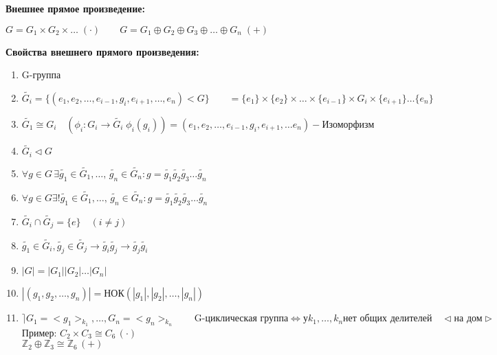 \documentclass[12pt]{article}
\begin{document}
				
		
		
		
		\hypertarget{def:out_comp}{\textbf{Внешнее прямое произведение:}} $G=G_1 \times G_2 \times \dots \; (\cdot) \qquad G=G_1\oplus G_2 \oplus G_3 \oplus \dots \oplus G_n \; (+)$
		
		
		\hypertarget{inpro:out_comp}{\textbf{Свойства внешнего прямого произведения:}}
		\begin{enumerate}
			\item G-группа
			\item $\tilde{G_i}=\{ (e_1, e_2, \dots , e_{i-1}, g_i, e_{i+1}, \dots, e_n)<G \} \qquad 
			=\{e_1 \}\times \{e_2\} \times \dots \times \{e_{i-1}\} \times G_i \times \{e_{i+1}\}\dots \{e_n\}$
			\item $\tilde{G_1} \cong G_i \quad (\phi_i :G_i \rightarrow \tilde{G_i} \; \phi_i(g_i))=(e_1, e_2, \dots, e_{i-1}, g_i, e_{i+1}, \dots e_n)- \text{Изоморфизм} $
			\item $\tilde{G_i} \lhd G$
			
			\item $\forall g \in G \, \exists \tilde{g_1}\in \tilde{G_1}, \dots , \, \tilde{g_n}\in \tilde{G_n}: g=\tilde{g_1} \tilde{g_2} \tilde{g_3} \dots \tilde{g_n} $	
			\item $\forall g\in G \exists! \tilde{g_1}\in \tilde{G_1}, \dots , \, \tilde{g_n} \in \tilde{G_n}: g=\tilde{g_1} \tilde{g_2} \tilde{g_3} \dots \tilde{g_n} $
			\item $\tilde{G_i} \cap \tilde{G_j}=\{e\} \quad (i\not= j)  $
			\item $\tilde{g_1}\in \tilde{G_i}, \tilde{g_j}\in \tilde{G_j} \rightarrow \tilde{g_i}\tilde{g_j}\rightarrow \tilde{g_j}\tilde{g_i}$  
			\item $|G|=|G_1||G_2|\dots |G_n|$
			\item $|(g_1,g_2, \dots ,g_n)|=\text{НОК}(|g_1|,|g_2|, \dots , |g_n|)  $
			\item $\rceil G_1=<g_1>_{k_1}, \dots ,G_n=<g_n>_{k_n}  \qquad \text{G-циклическая группа} \Leftrightarrow \text{у} k_1, \dots , k_n \text{нет общих делителей} \quad \lhd \text{на дом} \rhd$\\
			Пример: $C_2 \times C_3 \cong C_6 \, (\cdot) $\\
			$\mathds{Z}_2 \oplus \mathds{Z}_3 \cong \mathds{Z}_6 \, (+)$ 
		\end{enumerate} 
\end{document}
